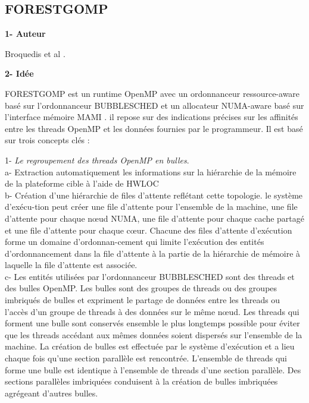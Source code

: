 \subsection{FORESTGOMP} %

\textbf{1- Auteur}

Broquedis et al \cite{Bro29}.

\textbf{2- Idée}

FORESTGOMP est un runtime OpenMP avec un ordonnanceur ressource-aware basé sur l'ordonnanceur BUBBLESCHED \cite{BUB83} et un allocateur NUMA-aware basé sur l'interface mémoire MAMI \cite{MAM32}. 
il repose sur des indications précises sur les affinités entre les threads OpenMP et les données fournies par le programmeur. Il est basé sur trois concepts clés :

1- \textit{Le regroupement des threads OpenMP en bulles}.\\
a- Extraction automatiquement les informations sur la hiérarchie de la mémoire de la plateforme cible à l'aide de HWLOC \cite{HWL30} \\
b- Création d'une hiérarchie de files d'attente reflétant cette topologie.
le système d'exécu-tion peut créer une file d'attente pour l'ensemble de la machine, une file d'attente pour chaque nœud NUMA, une file d'attente pour chaque cache partagé et une file d'attente pour chaque cœur. 
Chacune des files d'attente d'exécution forme un domaine d'ordonnan-cement qui limite l'exécution des entités d'ordonnancement dans la file d'attente à la partie de la hiérarchie de mémoire à laquelle la file d'attente est associée. \\
c- Les entités utilisées par l'ordonnanceur BUBBLESCHED sont des threads et des bulles OpenMP. 
Les bulles sont des groupes de threads ou des groupes imbriqués de bulles et expriment le partage de données entre les threads ou l'accès d'un groupe de threads à des données sur le même nœud.
Les threads qui forment une bulle sont conservés ensemble le plus longtemps possible pour éviter que les threads accédant aux mêmes données soient dispersés sur l'ensemble de la machine. 
La création de bulles est effectuée par le système d'exécution et a lieu chaque fois qu'une section parallèle est rencontrée. 
L'ensemble de threads qui forme une bulle est identique à l'ensemble de threads d'une section parallèle. 
Des sections parallèles imbriquées conduisent à la création de bulles imbriquées agrégeant d'autres bulles. 

